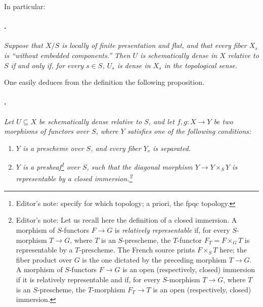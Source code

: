 In particular:

\paragraph{.}
\textit{Suppose that \(X/S\) is locally of finite presentation and
flat, and that every fiber \(X_s\) is ``without embedded
components.'' Then \(U\) is schematically dense in \(X\) relative to
\(S\) if and only if, for every \(s\in S\), \(U_s\) is dense in
\(X_s\) in the topological sense.}

One easily deduces from the definition the following proposition.

\paragraph{.}
\textit{Let \(U\subseteq X\) be schematically dense relative to \(S\),
and let \(f,g:X\to Y\) be two morphisms of functors over \(S\), where
\(Y\) satisfies one of the following conditions:}

\begin{enumerate}
\item[\SGAInlineRefTarget{sga3:xviii:prop:1.4:item:i}(i)] \textit{\(Y\) is a prescheme over \(S\), and every fiber
  \(Y_s\) is separated.}
\item[\SGAInlineRefTarget{sga3:xviii:prop:1.4:item:ii}(ii)] \textit{\(Y\) is a presheaf\footnote{Editor's note:
  specify for which topology; a priori, the fpqc topology.} over
  \(S\), such that the diagonal morphism
  \(Y\to Y\times_S Y\) is representable by a closed
  immersion.\footnote{Editor's note: Let us recall here the
  definition of a closed immersion. A morphism of \(S\)-functors
  \(F\to G\) is \emph{relatively representable} if, for every
  \(S\)-morphism \(T\to G\), where \(T\) is an \(S\)-prescheme, the
  \(T\)-functor \(F_T=F\times_G T\) is representable by a
  \(T\)-prescheme. The French source prints \(F\times_S T\) here;
  the fiber product over \(G\) is the one dictated by the preceding
  morphism \(T\to G\). A morphism of \(S\)-functors \(F\to G\) is an open
  (respectively, closed) immersion if it is relatively representable
  and if, for every \(S\)-morphism \(T\to G\), where \(T\) is an
  \(S\)-prescheme, the \(T\)-morphism \(F_T\to T\) is an open
  (respectively, closed) immersion.}}
\end{enumerate}

